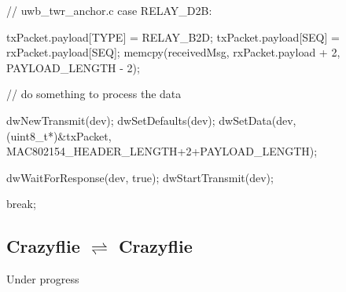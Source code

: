 \documentclass[]{article}
\begin{document}
\begin{C}
// uwb_twr_anchor.c
case RELAY_D2B:
{      
	txPacket.payload[TYPE] = RELAY_B2D;
	txPacket.payload[SEQ] = rxPacket.payload[SEQ];
	memcpy(receivedMsg, rxPacket.payload + 2, PAYLOAD_LENGTH - 2);
	
	// do something to process the data
	
	dwNewTransmit(dev);
	dwSetDefaults(dev);
	dwSetData(dev, (uint8_t*)&txPacket, MAC802154_HEADER_LENGTH+2+PAYLOAD_LENGTH);
	
	dwWaitForResponse(dev, true);
	dwStartTransmit(dev);
	
	break;
}
\end{C}

\subsection{\texorpdfstring{Crazyflie $\rightleftharpoons$ Crazyflie}%
	{Between Crazyflie and Crazyflie}}

\noindent Under progress
\end{document}
